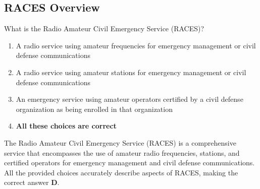 \subsection{RACES Overview}
\label{T1A10}

\begin{tcolorbox}[colback=gray!10!white,colframe=black!75!black,title=T1A10]
What is the Radio Amateur Civil Emergency Service (RACES)?
\begin{enumerate}[label=\Alph*,noitemsep]
    \item A radio service using amateur frequencies for emergency management or civil defense communications
    \item A radio service using amateur stations for emergency management or civil defense communications
    \item An emergency service using amateur operators certified by a civil defense organization as being enrolled in that organization
    \item \textbf{All these choices are correct}
\end{enumerate}
\end{tcolorbox}

The Radio Amateur Civil Emergency Service (RACES) is a comprehensive service that encompasses the use of amateur radio frequencies, stations, and certified operators for emergency management and civil defense communications. All the provided choices accurately describe aspects of RACES, making the correct answer \textbf{D}.